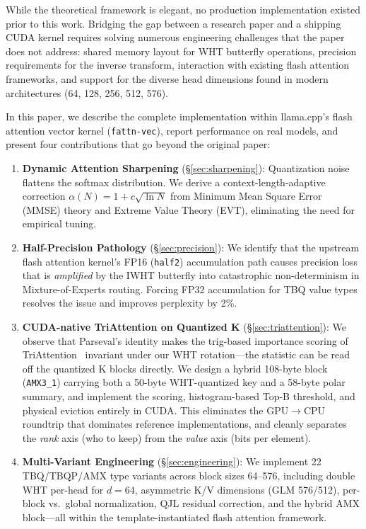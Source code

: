 \documentclass[10pt,twocolumn]{article}
\begin{document}
While the theoretical framework is elegant, no production implementation existed prior to this work. Bridging the gap between a research paper and a shipping CUDA kernel requires solving numerous engineering challenges that the paper does not address: shared memory layout for WHT butterfly operations, precision requirements for the inverse transform, interaction with existing flash attention frameworks, and support for the diverse head dimensions found in modern architectures (64, 128, 256, 512, 576).

In this paper, we describe the complete implementation within llama.cpp's flash attention vector kernel (\texttt{fattn-vec}), report performance on real models, and present four contributions that go beyond the original paper:

\begin{enumerate}[leftmargin=*,topsep=2pt,itemsep=1pt]
\item \textbf{Dynamic Attention Sharpening} (\S\ref{sec:sharpening}): Quantization noise flattens the softmax distribution. We derive a context-length-adaptive correction $\alpha(N) = 1 + c\sqrt{\ln N}$ from Minimum Mean Square Error (MMSE) theory and Extreme Value Theory (EVT), eliminating the need for empirical tuning.

\item \textbf{Half-Precision Pathology} (\S\ref{sec:precision}): We identify that the upstream flash attention kernel's FP16 (\texttt{half2}) accumulation path causes precision loss that is \emph{amplified} by the IWHT butterfly into catastrophic non-determinism in Mixture-of-Experts routing. Forcing FP32 accumulation for TBQ value types resolves the issue and improves perplexity by 2\%.

\item \textbf{CUDA-native TriAttention on Quantized K} (\S\ref{sec:triattention}): We observe that Parseval's identity makes the trig-based importance scoring of TriAttention~\cite{triattention2026} invariant under our WHT rotation---the statistic can be read off the quantized K blocks directly. We design a hybrid 108-byte block (\texttt{AMX3\_1}) carrying both a 50-byte WHT-quantized key and a 58-byte polar summary, and implement the scoring, histogram-based Top-B threshold, and physical eviction entirely in CUDA. This eliminates the GPU$\to$CPU roundtrip that dominates reference implementations, and cleanly separates the \emph{rank} axis (who to keep) from the \emph{value} axis (bits per element).

\item \textbf{Multi-Variant Engineering} (\S\ref{sec:engineering}): We implement 22 TBQ/TBQP/AMX type variants across block sizes 64--576, including double WHT per-head for $d=64$, asymmetric K/V dimensions (GLM 576/512), per-block vs.\ global normalization, QJL residual correction, and the hybrid AMX block---all within the template-instantiated flash attention framework.
\end{enumerate}
\end{document}
